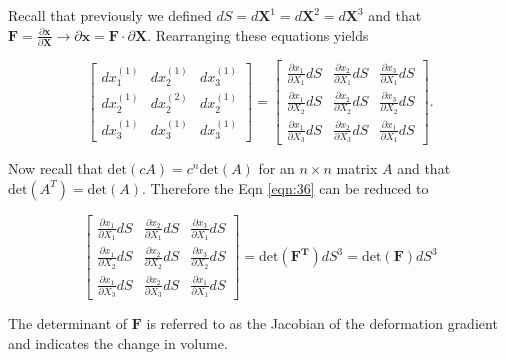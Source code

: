 \documentclass[a4paper]{article}
\begin{document}
Recall that previously we defined $dS = d\mathbf{X}^1 = d\mathbf{X}^2 = d\mathbf{X}^3$ and that $\mathbf{F} = \frac{\partial \mathbf{x}}{\partial \mathbf{X}} \rightarrow \partial \mathbf{x} = \mathbf{F} \cdot \partial \mathbf{X}$. Rearranging these equations yields

\begin{equation}\label{eqn:36}
    \begin{bmatrix}
    dx_{1}^{(1)} & dx_{2}^{(1)} & dx_{3}^{(1)} \\
    dx_{2}^{(1)} & dx_{2}^{(2)} & dx_{2}^{(1)} \\
    dx_{3}^{(1)} & dx_{3}^{(1)} & dx_{3}^{(1)}
    \end{bmatrix} = 
    \begin{bmatrix}
     \frac{\partial x_1}{\partial X_1} dS & 
     \frac{\partial x_2}{\partial X_1} dS & 
     \frac{\partial x_3}{\partial X_1} dS \\
     \frac{\partial x_1}{\partial X_2} dS & 
     \frac{\partial x_2}{\partial X_2} dS &
     \frac{\partial x_3}{\partial X_2} dS\\
    \frac{\partial x_1}{\partial X_3} dS & 
    \frac{\partial x_2}{\partial X_3} dS & 
    \frac{\partial x_1}{\partial X_1} dS
    \end{bmatrix}. 
\end{equation}

Now recall that $\text{det}(cA) = c^n \text{det}(A)$ for an $n\times n$ matrix $A$ and that $\text{det}(A^T) = \text{det}(A)$. Therefore the Eqn \ref{eqn:36} can be reduced to 

\begin{equation}
    \begin{bmatrix}
     \frac{\partial x_1}{\partial X_1} dS & 
     \frac{\partial x_2}{\partial X_1} dS & 
     \frac{\partial x_3}{\partial X_1} dS \\
     \frac{\partial x_1}{\partial X_2} dS & 
     \frac{\partial x_2}{\partial X_2} dS &
     \frac{\partial x_3}{\partial X_2} dS\\
    \frac{\partial x_1}{\partial X_3} dS & 
    \frac{\partial x_2}{\partial X_3} dS & 
    \frac{\partial x_1}{\partial X_1} dS
    \end{bmatrix} = 
    \text{det}(\mathbf{F^T}) dS^3 = \text{det}(\mathbf{F})dS^3
\end{equation}

The determinant of $\mathbf{F}$ is referred to as the Jacobian of the deformation gradient and indicates the change in volume.
\end{document}
